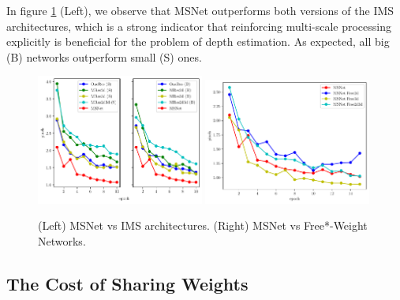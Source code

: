 \documentclass[runningheads]{llncs}
\begin{document}
In figure \ref{fig:mae_SFNvsGenericNets} (Left), we observe that MSNet outperforms both versions of the IMS architectures, which is a strong indicator that reinforcing multi-scale processing explicitly is beneficial for the problem of depth estimation. As expected, all big (B) networks outperform small (S) ones.

\begin{figure}[!htbp]
    \centering
    \includegraphics[width=0.49\textwidth, height=0.3\textwidth]{figures/freiburg_msnet_vs_monolithic_mae.pdf}
    \includegraphics[width=0.49\textwidth, height=0.3\textwidth]{figures/freiburg_msnet_vs_free_weights_mae.pdf}
    \caption{(Left) MSNet vs IMS architectures. (Right) MSNet vs Free*-Weight Networks.}
    \label{fig:mae_SFNvsGenericNets}
\end{figure}

\subsection{The Cost of Sharing Weights}
\end{document}
